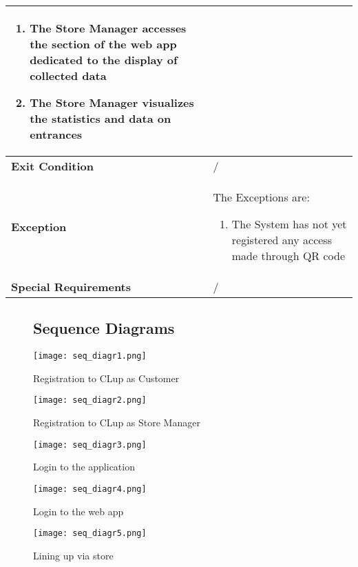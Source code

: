 \begin{enumerate}
{\begin{longtable}{|L{4cm}|L{10cm}|}
\begin{enumerate}
                        \item The Store Manager accesses the section of the web app dedicated to the display of collected data
                        \item The Store Manager visualizes the statistics and data on entrances
                    \end{enumerate} \\
                \hline
                \textbf{Exit Condition} & / \\
                \hline
                \textbf{Exception} & The Exceptions are: \begin{enumerate}
                        \item The System has not yet registered any access made through QR code
                    \end{enumerate} \\
                \hline
                \textbf{Special Requirements} & / \\
                \hline
            \end{longtable}}            
        \end{enumerate}

\begin{figure}
    \subsection{Sequence Diagrams}
    \vspace{1cm}
    \centering
    \texttt{[image: seq\_diagr1.png]}
    \caption{Registration to CLup as Customer}
\end{figure}

\begin{figure}
    \centering
    \texttt{[image: seq\_diagr2.png]}
    \caption{Registration to CLup as Store Manager}
\end{figure}

\begin{figure}
    \centering
    \texttt{[image: seq\_diagr3.png]}
    \caption{Login to the application}
\end{figure}

\begin{figure}
    \centering
    \texttt{[image: seq\_diagr4.png]}
    \caption{Login to the web app}
\end{figure}

\begin{figure}
    \centering
    \texttt{[image: seq\_diagr5.png]}
    \caption{Lining up via store}
\end{figure}

